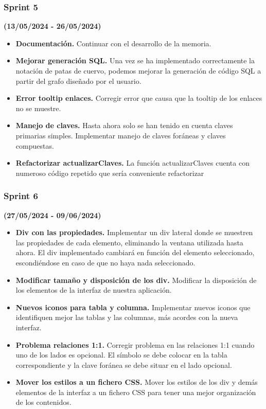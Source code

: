 \subsubsection{Sprint 5}
\textbf{(13/05/2024 - 26/05/2024)}
\begin{itemize}
    \item \textbf{Documentación.} Continuar con el desarrollo de la memoria.
    \item \textbf{Mejorar generación SQL.} Una vez se ha implementado correctamente la notación de patas de cuervo, podemos mejorar la generación de código SQL a partir del grafo diseñado por el usuario.
    \item \textbf{Error tooltip enlaces.} Corregir error que causa que la tooltip de los enlaces no se muestre.
    \item \textbf{Manejo de claves.} Hasta ahora solo se han tenido en cuenta claves primarias simples. Implementar manejo de claves foráneas y claves compuestas.
    \item \textbf{Refactorizar actualizarClaves.} La función actualizarClaves cuenta con numeroso código repetido que sería conveniente refactorizar
\end{itemize}

\subsubsection{Sprint 6}
\textbf{(27/05/2024 - 09/06/2024)}
\begin{itemize}
    \item \textbf{Div con las propiedades.} Implementar un div lateral donde se muestren las propiedades de cada elemento, eliminando la ventana utilizada hasta ahora. El div implementado cambiará en función del elemento seleccionado, escondiéndose en caso de que no haya nada seleccionado.
    \item \textbf{Modificar tamaño y disposición de los div.} Modificar la disposición de los elementos de la interfaz de nuestra aplicación.
    \item \textbf{Nuevos iconos para tabla y columna.} Implementar nuevos iconos que identifiquen mejor las tablas y las columnas, más acordes con la nueva interfaz.
    \item \textbf{Problema relaciones 1:1.} Corregir problema en las relaciones 1:1 cuando uno de los lados es opcional. El símbolo se debe colocar en la tabla correspondiente y la clave foránea se debe situar en el lado opcional.
    \item \textbf{Mover los estilos a un fichero CSS.} Mover los estilos de los div y demás elementos de la interfaz a un fichero CSS para tener una mejor organización de los contenidos.
\end{itemize}

